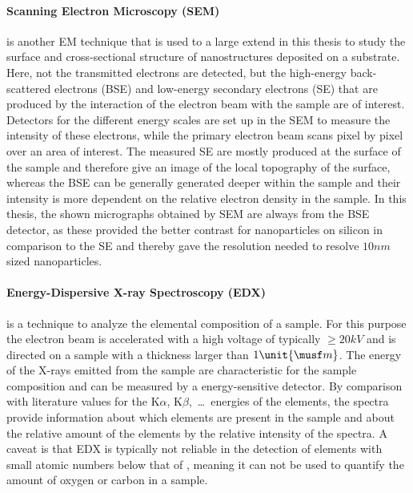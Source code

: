 \documentclass[\main/dresen_thesis.tex]{subfiles}
\begin{document}
    \paragraph{Scanning Electron Microscopy (SEM)}
      is another EM technique that is used to a large extend in this thesis to study the surface and cross-sectional structure of nanostructures deposited on a substrate.
      Here, not the transmitted electrons are detected, but the high-energy back-scattered electrons (BSE) and low-energy secondary electrons (SE) that are produced by the interaction of the electron beam with the sample are of interest.
      Detectors for the different energy scales are set up in the SEM to measure the intensity of these electrons, while the primary electron beam scans pixel by pixel over an area of interest.
      The measured SE are mostly produced at the surface of the sample and therefore give an image of the local topography of the surface, whereas the BSE can be generally generated deeper within the sample and their intensity is more dependent on the relative electron density in the sample.
      In this thesis, the shown micrographs obtained by SEM are always from the BSE detector, as these provided the better contrast for nanoparticles on silicon in comparison to the SE and thereby gave the resolution needed to resolve $10 \unit{nm}$ sized nanoparticles.

    \paragraph{Energy-Dispersive X-ray Spectroscopy (EDX)}
      is a technique to analyze the elemental composition of a sample.
      For this purpose the electron beam is accelerated with a high voltage of typically $\geq 20 \unit{kV}$ and is directed on a sample with a thickness larger than $1 \unit{\musf m}$.
      The energy of the X-rays emitted from the sample are characteristic for the sample composition and can be measured by a energy-sensitive detector.
      By comparison with literature values for the K$\alpha$, K$\beta$,~\dots~energies of the elements, the spectra provide information about which elements are present in the sample and about the relative amount of the elements by the relative intensity of the spectra.
      A caveat is that EDX is typically not reliable in the detection of elements with small atomic numbers below that of , meaning it can not be used to quantify the amount of oxygen or carbon in a sample.
\end{document}
